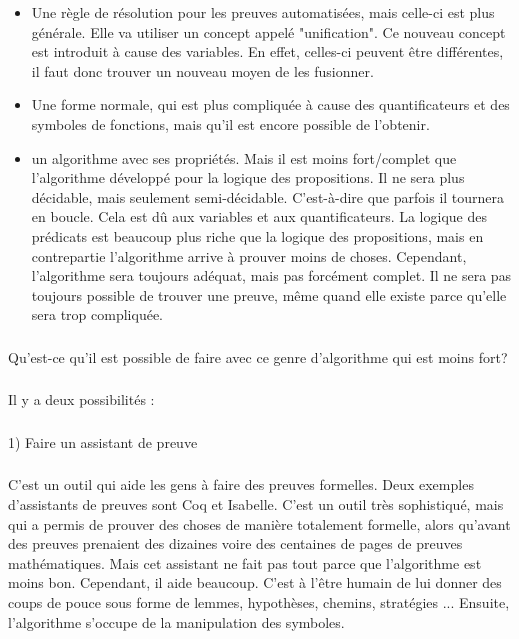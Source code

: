 \begin{itemize}

  \item Une règle de résolution pour les preuves automatisées, mais celle-ci est plus générale. Elle va utiliser un concept appelé "unification". Ce nouveau concept est introduit à cause des variables. En effet, celles-ci peuvent être différentes, il faut donc trouver un nouveau moyen de les fusionner.
  \item Une forme normale, qui  est plus compliquée à cause des quantificateurs et des symboles de fonctions, mais qu'il est encore possible de l'obtenir.
  \item un algorithme avec ses propriétés. Mais il est moins fort/complet que l'algorithme développé pour la logique des propositions. Il ne sera plus décidable, mais seulement semi-décidable. C'est-à-dire que parfois il tournera en boucle. Cela est dû aux variables et aux quantificateurs. La logique des prédicats est beaucoup plus riche que la logique des propositions, mais en contrepartie l'algorithme arrive à prouver moins de choses. Cependant, l'algorithme sera toujours adéquat, mais pas forcément complet. Il ne sera pas toujours possible de trouver une preuve, même quand elle existe parce qu'elle sera trop compliquée.

\end{itemize}

\subsubsection{}
Qu'est-ce qu'il est possible de faire avec ce genre d'algorithme qui est moins fort?

\subsubsection{}
Il y a deux possibilités : 
\subsubsection{}

1) Faire un assistant de preuve

\subsubsection{}
    C'est un outil qui aide les gens à faire des preuves formelles. Deux exemples d'assistants de preuves sont Coq et Isabelle. C'est un outil très sophistiqué, mais qui a permis de prouver des choses de manière totalement formelle, alors qu'avant des preuves prenaient des dizaines voire des centaines de pages de preuves mathématiques. Mais cet assistant ne fait pas tout parce que l'algorithme est moins bon. Cependant, il aide beaucoup. C'est à l'être humain de lui donner des coups de pouce sous forme de lemmes, hypothèses, chemins, stratégies ... Ensuite, l'algorithme s'occupe de la manipulation des symboles.
